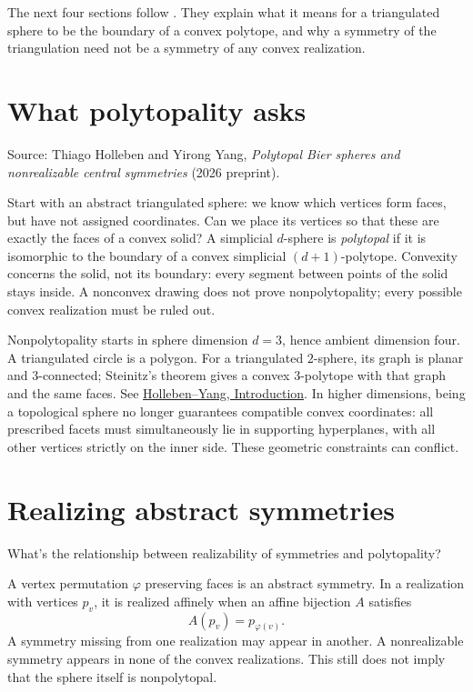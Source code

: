 \noindent
The next four sections follow
\cite{HollebenYang2026}. They explain what
it means for a triangulated sphere to be
the boundary of a convex polytope, and why
a symmetry of the triangulation need not
be a symmetry of any convex realization.

\section{What polytopality asks}
\label{subsection-polytopality}

\noindent
Source: Thiago Holleben and Yirong Yang,
\emph{Polytopal Bier spheres and
nonrealizable central symmetries}
\cite{HollebenYang2026} (2026 preprint).

Start with an abstract triangulated sphere:
we know which vertices form faces, but
have not assigned coordinates. Can we
place its vertices so that these are
exactly the faces of a convex solid?
A simplicial $d$-sphere is
\emph{polytopal} if it is isomorphic to
the boundary of a convex simplicial
$(d+1)$-polytope. Convexity concerns the
solid, not its boundary: every segment
between points of the solid stays inside.
A nonconvex drawing does not prove
nonpolytopality; every possible convex
realization must be ruled out.

Nonpolytopality starts in sphere dimension
$d=3$, hence ambient dimension four.
A triangulated circle is a polygon.
For a triangulated $2$-sphere, its graph
is planar and $3$-connected; Steinitz's
theorem gives a convex $3$-polytope with
that graph and the same faces. See
\href{https://arxiv.org/abs/2608.07233}
{Holleben--Yang, Introduction}.
In higher dimensions, being a topological
sphere no longer guarantees compatible
convex coordinates: all prescribed
facets must simultaneously lie in
supporting hyperplanes, with all other
vertices strictly on the inner side.
These geometric constraints can conflict.

\section{Realizing abstract symmetries}
\label{subsection-realizing-symmetries}

\noindent
What's the relationship between
realizability of symmetries and
polytopality?

\noindent
A vertex permutation $\varphi$ preserving
faces is an abstract symmetry. In a
realization with vertices $p_v$, it is
realized affinely when an affine
bijection $A$ satisfies
$$
A(p_v)=p_{\varphi(v)}.
$$
A symmetry missing from one realization
may appear in another. A nonrealizable
symmetry appears in none of the convex
realizations. This still does not imply
that the sphere itself is nonpolytopal.

